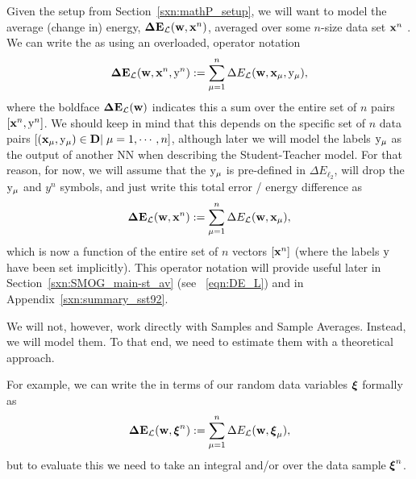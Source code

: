 Given the setup from Section~\ref{sxn:mathP_setup},
we will want to model the average (change in) energy,  $\mathbf{\Delta {E}}_{\mathcal{L}}(\mathbf{w}, \mathbf{x}^{n})$, averaged over some $n$-size data set $\mathbf{x}^{n}$ .
We can write the \TotalDataSampleError as
using an overloaded, operator notation 
\begin{align}
  \label{eqn:detopxy}
  \mathbf{\Delta {E}}_{\mathcal{L}}(\mathbf{w}, \mathbf{x}^{n}, \mathrm{y}^{n}) :=\sum_{\mu=1}^{n}\Delta E_{\mathcal{L}}({\mathbf{w}},{\mathbf{x}}_{\mu}, \mathrm{y}_{\mu})  ,
\end{align}
where the boldface $\mathbf{\Delta {E}}_{\mathcal{L}}(\mathbf{w})$ indicates this a sum over the entire set of  $n$ pairs $[\mathbf{x}^{n}, \mathrm{y}^{n}]$.
We should keep in mind that this depends on the specific set of $n$ data pairs
$[({\mathbf{x}}_{\mu},\mathrm{y}_{\mu})\in\mathbf{D}|\;\mu=1,\cdots,n]$, 
although later we will model the labels $\mathrm{y}_{\mu}$ as the output of another NN
when describing the Student-Teacher model.
%
For that reason, for now, we
will assume that the $\mathrm{y}_{\mu}$ is pre-defined in $\Delta E_{\ell_2}$,
will drop the $\mathrm{y}_{\mu}$ and $y^{n}$ symbols, 
and just write this total error / energy difference as
\begin{align}
  \label{eqn:detox_FIXLATER}
  \mathbf{\Delta {E}}_{\mathcal{L}}(\mathbf{w}, \mathbf{x}^{n}) :=\sum_{\mu=1}^{n}\Delta E_{\mathcal{L}}({\mathbf{w}},{\mathbf{x}}_{\mu})  ,
\end{align}
which is now a function of the entire set of  $n$ vectors $[\mathbf{x}^{n}]$
(where the labels $\mathrm{y}$ have been set implicitly).
This operator notation will provide useful later in Section~\ref{sxn:SMOG_main-st_av}
(see \EQN~\ref{eqn:DE_L}) and in Appendix~\ref{sxn:summary_sst92}.

We will not, however,  work directly with Samples and Sample Averages.
Instead, we will model them.
To that end, we need to estimate them with a theoretical approach.

For example, we can write the \TotalDataSampleError in terms of our random data variables $\boldsymbol{\xi}$ formally as
\begin{align}
\label{eqn:tdse}
\mathbf{\Delta {E}}_{\mathcal{L}}(\mathbf{w}, \boldsymbol{\xi}^{n}) := \sum_{\mu=1}^{n}\Delta E_{\mathcal{L}}(\mathbf{w},\boldsymbol{\xi}_{\mu}) ,
\end{align}
but to evaluate this we need to take an integral and/or \ExpectedValue over the data sample $\boldsymbol{\xi}^{n}$.

